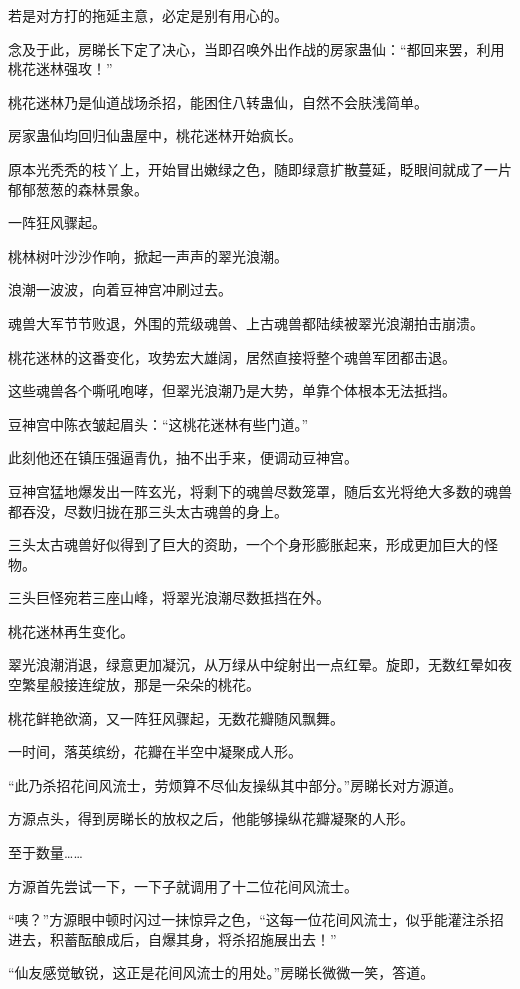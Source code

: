 \begin{this_body}
若是对方打的拖延主意，必定是别有用心的。

念及于此，房睇长下定了决心，当即召唤外出作战的房家蛊仙：“都回来罢，利用桃花迷林强攻！”

桃花迷林乃是仙道战场杀招，能困住八转蛊仙，自然不会肤浅简单。

房家蛊仙均回归仙蛊屋中，桃花迷林开始疯长。

原本光秃秃的枝丫上，开始冒出嫩绿之色，随即绿意扩散蔓延，眨眼间就成了一片郁郁葱葱的森林景象。

一阵狂风骤起。

桃林树叶沙沙作响，掀起一声声的翠光浪潮。

浪潮一波波，向着豆神宫冲刷过去。

魂兽大军节节败退，外围的荒级魂兽、上古魂兽都陆续被翠光浪潮拍击崩溃。

桃花迷林的这番变化，攻势宏大雄阔，居然直接将整个魂兽军团都击退。

这些魂兽各个嘶吼咆哮，但翠光浪潮乃是大势，单靠个体根本无法抵挡。

豆神宫中陈衣皱起眉头：“这桃花迷林有些门道。”

此刻他还在镇压强逼青仇，抽不出手来，便调动豆神宫。

豆神宫猛地爆发出一阵玄光，将剩下的魂兽尽数笼罩，随后玄光将绝大多数的魂兽都吞没，尽数归拢在那三头太古魂兽的身上。

三头太古魂兽好似得到了巨大的资助，一个个身形膨胀起来，形成更加巨大的怪物。

三头巨怪宛若三座山峰，将翠光浪潮尽数抵挡在外。

桃花迷林再生变化。

翠光浪潮消退，绿意更加凝沉，从万绿从中绽射出一点红晕。旋即，无数红晕如夜空繁星般接连绽放，那是一朵朵的桃花。

桃花鲜艳欲滴，又一阵狂风骤起，无数花瓣随风飘舞。

一时间，落英缤纷，花瓣在半空中凝聚成人形。

“此乃杀招花间风流士，劳烦算不尽仙友操纵其中部分。”房睇长对方源道。

方源点头，得到房睇长的放权之后，他能够操纵花瓣凝聚的人形。

至于数量……

方源首先尝试一下，一下子就调用了十二位花间风流士。

“咦？”方源眼中顿时闪过一抹惊异之色，“这每一位花间风流士，似乎能灌注杀招进去，积蓄酝酿成后，自爆其身，将杀招施展出去！”

“仙友感觉敏锐，这正是花间风流士的用处。”房睇长微微一笑，答道。


\end{this_body}
